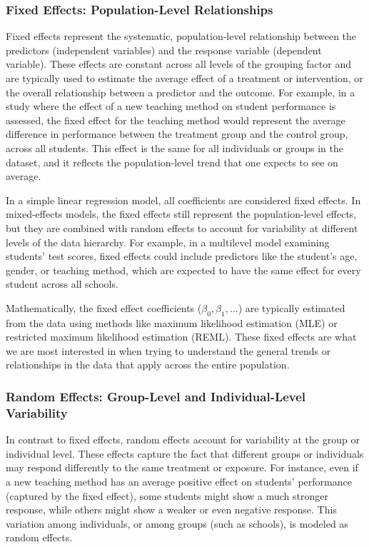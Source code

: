 \subsubsection{Fixed Effects: Population-Level Relationships}
Fixed effects represent the systematic, population-level relationship between the predictors (independent variables) and the response variable (dependent variable). These effects are constant across all levels of the grouping factor and are typically used to estimate the average effect of a treatment or intervention, or the overall relationship between a predictor and the outcome. For example, in a study where the effect of a new teaching method on student performance is assessed, the fixed effect for the teaching method would represent the average difference in performance between the treatment group and the control group, across all students. This effect is the same for all individuals or groups in the dataset, and it reflects the population-level trend that one expects to see on average.

In a simple linear regression model, all coefficients are considered fixed effects. In mixed-effects models, the fixed effects still represent the population-level effects, but they are combined with random effects to account for variability at different levels of the data hierarchy. For example, in a multilevel model examining students' test scores, fixed effects could include predictors like the student's age, gender, or teaching method, which are expected to have the same effect for every student across all schools.

Mathematically, the fixed effect coefficients ($\beta_0,\beta_1, \dots$) are typically estimated from the data using methods like maximum likelihood estimation (MLE) or restricted maximum likelihood estimation (REML). These fixed effects are what we are most interested in when trying to understand the general trends or relationships in the data that apply across the entire population.

\subsubsection*{Random Effects: Group-Level and Individual-Level Variability}
In contrast to fixed effects, random effects account for variability at the group or individual level. These effects capture the fact that different groups or individuals may respond differently to the same treatment or exposure. For instance, even if a new teaching method has an average positive effect on students' performance (captured by the fixed effect), some students might show a much stronger response, while others might show a weaker or even negative response. This variation among individuals, or among groups (such as schools), is modeled as random effects.

